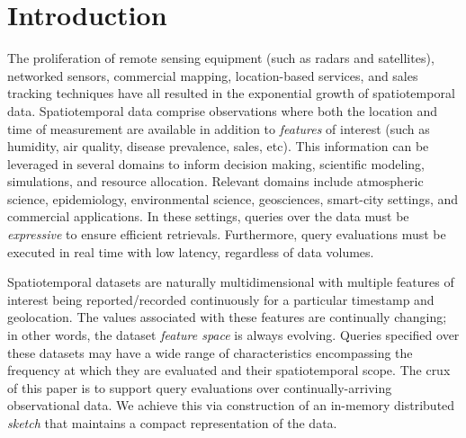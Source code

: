 \section{Introduction}
\label{sec:introduction}
The proliferation of remote sensing equipment (such as radars and satellites), networked sensors, commercial mapping, location-based services, and sales tracking techniques have all resulted in the exponential growth of spatiotemporal data. Spatiotemporal data comprise observations where both the location and time of measurement are available in addition to \emph{features} of interest (such as humidity, air quality, disease prevalence, sales, etc). This information can be leveraged in several domains to inform decision making, scientific modeling, simulations, and resource allocation. Relevant domains include atmospheric science, epidemiology, environmental science, geosciences, smart-city settings, and commercial applications. In these settings, queries over the data must be \emph{expressive} to ensure efficient retrievals. Furthermore, query evaluations must be executed in real time with low latency, regardless of data volumes.

Spatiotemporal datasets are naturally multidimensional with multiple features of interest being reported/recorded continuously for a particular timestamp and geolocation. The values associated with these features are continually changing; in other words, the dataset \emph{feature space} is always evolving.  Queries specified over these datasets may have a wide range of characteristics encompassing the frequency at which they are evaluated and their spatiotemporal scope. The crux of this paper is to support query evaluations over continually-arriving observational data. We achieve this via construction of an in-memory distributed \emph{sketch} that maintains a compact representation of the data.

